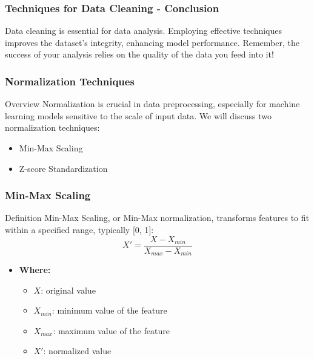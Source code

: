 \documentclass[aspectratio=169]{beamer}
\begin{document}
\begin{frame}[fragile]
    \frametitle{Techniques for Data Cleaning - Conclusion}
    Data cleaning is essential for data analysis. 
    Employing effective techniques improves the dataset's integrity, enhancing model performance. 
    Remember, the success of your analysis relies on the quality of the data you feed into it!
\end{frame}

\begin{frame}[fragile]
    \frametitle{Normalization Techniques}
    \begin{block}{Overview}
        Normalization is crucial in data preprocessing, especially for machine learning models sensitive to the scale of input data. 
        We will discuss two normalization techniques: 
        \begin{itemize}
            \item Min-Max Scaling
            \item Z-score Standardization
        \end{itemize}
    \end{block}
\end{frame}

\begin{frame}[fragile]
    \frametitle{Min-Max Scaling}
    \begin{block}{Definition}
        Min-Max Scaling, or Min-Max normalization, transforms features to fit within a specified range, typically [0, 1]:
        \begin{equation}
            X' = \frac{X - X_{min}}{X_{max} - X_{min}}
        \end{equation}
    \end{block}
    
    \begin{itemize}
        \item \textbf{Where:}
            \begin{itemize}
                \item $X$: original value
                \item $X_{min}$: minimum value of the feature
                \item $X_{max}$: maximum value of the feature
                \item $X'$: normalized value
            \end{itemize}
    \end{itemize}
\end{frame}
\end{document}
